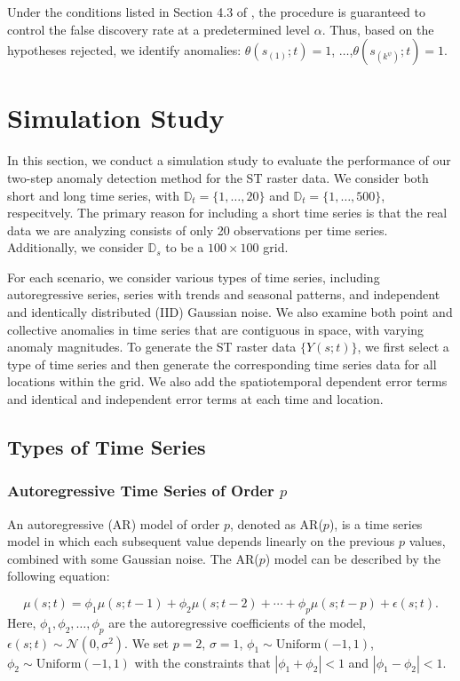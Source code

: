 \documentclass[11pt]{article}
\begin{document}
Under the conditions listed in Section 4.3 of \citet{cai2022laws}, the procedure is guaranteed to control the false discovery rate at a predetermined level $\alpha$. Thus, based on the hypotheses rejected, we identify anomalies: $\theta(s_{(1)};t)=1$, $\ldots$,$\theta(s_{(k^{\psi})};t)=1$.





\section{Simulation Study}\label{sec: simulation}
In this section, we conduct a simulation study to evaluate the performance of our two-step anomaly detection method for the ST raster data. We consider both short and long time series, with $\mathbb{D}_t=\{1,\ldots,20\}$ and $\mathbb{D}_t=\{1,\ldots,500\}$, respecitvely. The primary reason for including a short time series is that the real data we are analyzing consists of only 20 observations per time series. Additionally, we consider $\mathbb{D}_s$ to be a $100\times 100$ grid. 

For each scenario, we consider various types of time series, including autoregressive series, series with trends and seasonal patterns, and independent and identically distributed (IID) Gaussian noise. We also examine both point and collective anomalies in time series that are contiguous in space, with varying anomaly magnitudes.  
To generate the ST raster data $\{Y(s;t)\}$, we first select a type of time series and then generate the corresponding time series data for all locations within the grid. We also add the spatiotemporal dependent error terms and identical and independent error terms at each time and location.

\subsection{Types of Time Series}
\subsubsection*{Autoregressive Time Series of Order $p$}
An autoregressive (AR) model of order $p$, denoted as AR($p$), is a time series model in which each subsequent value depends linearly on the previous $p$ values, combined with some Gaussian noise. The AR($p$) model can be described by the following equation:

\begin{equation}
	\mu(s;t) = \phi_1 \mu(s;t-1) + \phi_2 \mu(s;t-2) + \cdots + \phi_p \mu(s;t-p) + \epsilon(s;t).
\end{equation}
Here, $\phi_1, \phi_2, \dots, \phi_p$ are the autoregressive coefficients of the model, $\epsilon(s;t) \sim \mathcal{N}(0, \sigma^2)$. We set $p=2$, $\sigma=1$, $\phi_1\sim \mathrm{Uniform}(-1,1)$, $\phi_2 \sim \mathrm{Uniform(-1,1)}$ with the constraints that $|\phi_1+\phi_2|<1$ and $|\phi_1-\phi_2|<1$.
\end{document}
